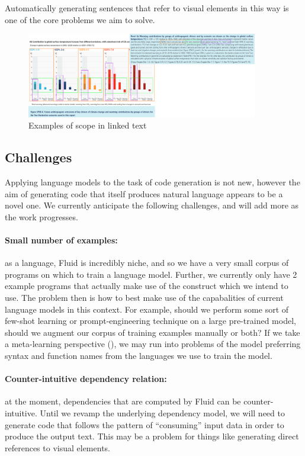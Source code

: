 Automatically generating sentences that refer to visual elements in this way is one of the core problems we aim to solve.

\begin{figure}
   \includegraphics[width=0.9\textwidth]{fig/ipcc-visual-elements.png}
   \caption{Examples of scope in linked text}
   \label{fig:visual-element-scope}
\end{figure}

\subsection{Challenges}
Applying language models to the task of code generation is not new, however the aim of generating code that
itself produces natural language appears to be a novel one. We currently anticipate the following challenges,
and will add more as the work progresses.

\paragraph{Small number of examples:} as a language, Fluid is incredibly niche, and so we have a very small corpus
of programs on which to train a language model. Further, we currently only have 2 example programs that actually make
use of the  construct which we intend to use. The problem then is how to best make use of the capabalities
of current language models in this context. For example, should we perform some sort of few-shot learning or prompt-engineering
technique on a large pre-trained model, should we augment our corpus of training examples manually or both? If we take a meta-learning
perspective (), we may run into problems of the model preferring syntax and function names from the languages we use to
train the model.

\paragraph{Counter-intuitive dependency relation:} at the moment, dependencies that are computed by Fluid can be counter-intuitive.
Until we revamp the underlying dependency model, we will need to generate code that follows the pattern of ``consuming'' input
data in order to produce the output text. This may be a problem for things like generating direct references to visual elements.

